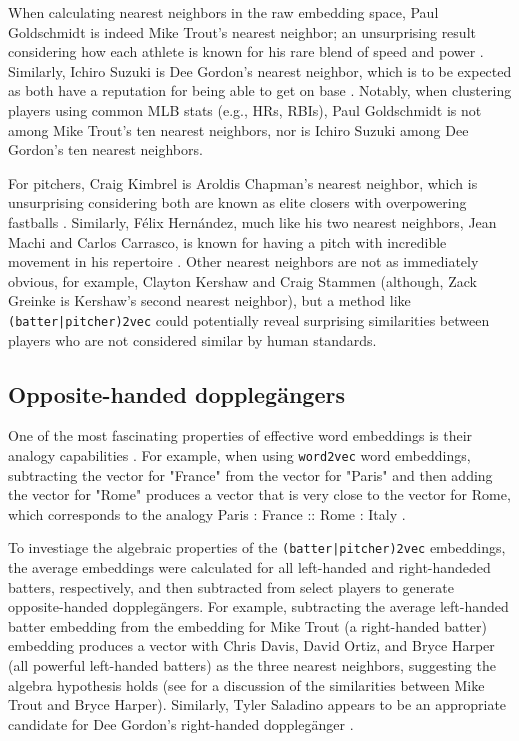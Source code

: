 \documentclass{article}
\begin{document}
When calculating nearest neighbors in the raw embedding space, Paul Goldschmidt is indeed Mike Trout's nearest neighbor; an unsurprising result considering how each athlete is known for his rare blend of speed and power \parencite{Kory2015}. Similarly, Ichiro Suzuki is Dee Gordon's nearest neighbor, which is to be expected as both have a reputation for being able to get on base \parencite{Sullivan2015}. Notably, when clustering players using common MLB stats (e.g., HRs, RBIs), Paul Goldschmidt is not among Mike Trout's ten nearest neighbors, nor is Ichiro Suzuki among Dee Gordon's ten nearest neighbors.

For pitchers, Craig Kimbrel is Aroldis Chapman's nearest neighbor, which is unsurprising considering both are known as elite closers with overpowering fastballs \parencite{Mirsky2016}. Similarly, Félix Hernández, much like his two nearest neighbors, Jean Machi and Carlos Carrasco, is known for having a pitch with incredible movement in his repertoire \parencite{Buchanan2015, Romano2015, Berg2016}. Other nearest neighbors are not as immediately obvious, for example, Clayton Kershaw and Craig Stammen (although, Zack Greinke is Kershaw's second nearest neighbor), but a method like \texttt{(batter|pitcher)2vec} could potentially reveal surprising similarities between players who are not considered similar by human standards.

\subsection{Opposite-handed dopplegängers}

One of the most fascinating properties of effective word embeddings is their analogy capabilities \parencite{Mikolov2013a}. For example, when using \texttt{word2vec} word embeddings, subtracting the vector for "France" from the vector for "Paris" and then adding the vector for "Rome" produces a vector that is very close to the vector for Rome, which corresponds to the analogy Paris : France :: Rome : Italy \parencite{Mikolov2013a}.

To investiage the algebraic properties of the \texttt{(batter|pitcher)2vec} embeddings, the average embeddings were calculated for all left-handed and right-handeded batters, respectively, and then subtracted from select players to generate opposite-handed dopplegängers. For example, subtracting the average left-handed batter embedding from the embedding for Mike Trout (a right-handed batter) embedding produces a vector with Chris Davis, David Ortiz, and Bryce Harper (all powerful left-handed batters) as the three nearest neighbors, suggesting the algebra hypothesis holds (see \parencite{Spector2016} for a discussion of the similarities between Mike Trout and Bryce Harper). Similarly, Tyler Saladino appears to be an appropriate candidate for Dee Gordon's right-handed dopplegänger \parencite{Chamberlain2017}.
\end{document}

